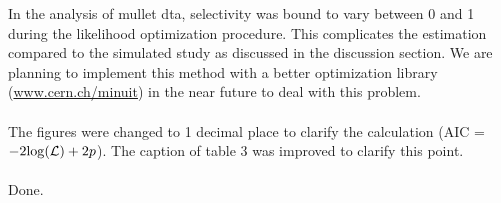 \documentclass[11pt]{article}
\begin{document}
\begin{spacing}{1.2}
In the analysis of mullet dta, selectivity was bound to vary between 0 and 1 during the likelihood optimization procedure. This complicates the estimation compared to the simulated study as discussed in the discussion section. We are planning to implement this method with a better optimization library (\url{www.cern.ch/minuit}) in the near future to deal with this problem. \\


 \\
The figures were changed to 1 decimal place to clarify the calculation (AIC =$-2 {\rm log}(\mathcal{L}) + 2p$). The caption of table 3 was improved to clarify this point. \\
 
 \\
Done. \\

\end{spacing}

\vspace{3cm}

\end{document}
